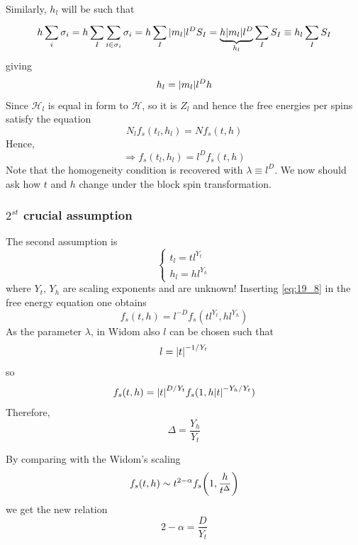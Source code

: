 \documentclass[../main/main.tex]{subfiles}
\begin{document}
Similarly, \( h_l \) will be such that
\begin{equation}
  h \sum_{i}^{} \sigma _i = h \sum_{I}^{} \sum_{i \in \sigma _i}^{}  \sigma _i = h \sum_{I}^{}    \abs{m_l} l^D S_I
  = \underbrace{h \abs{m_l} l^D}_{h_l} \sum_{I}^{} S_I \equiv  h_l \sum_{I}^{} S_I
\end{equation}
giving
\begin{equation}
  h_l = \abs{m_l} l^D h
\end{equation}
Since \( \mathcal{H}_l \) is equal in form to \( \mathcal{H} \), so it is \( Z_l \) and hence the free energies per spins satisfy the equation
\begin{equation}
  N_l f_s (t_l,h_l) = N f_s (t,h)
\end{equation}
Hence,
\begin{equation}
  \Rightarrow  f_s (t_l,h_l) = l^D f_s (t,h)
\end{equation}
Note that the homogeneity condition is recovered with \( \lambda \equiv l^D \).
We now should ask how \( t \) and \( h \) change under the block spin transformation.

\subsubsection{\(  2^{st} \) crucial assumption}
The second assumption is
\begin{equation}
  \begin{cases}
     t_l = t l^{Y_t}\\
  h_l = h l^{Y_h}
  \end{cases}
  \label{eq:19_8}
\end{equation}
where \( Y_t, \, Y_h \) are scaling exponents and are unknown!
Inserting \eqref{eq:19_8} in the free energy equation one obtains
\begin{equation}
  f_s (t,h) = l^{-D} f_s (t l^{Y_t}, h l^{Y_h})
\end{equation}
As the parameter \( \lambda  \), in Widom also \( l \)  can be chosen such that
\begin{equation}
  l= \abs{t}^{-1/Y_t}
\end{equation}
so
\begin{equation}
  f_s (t,h) = \abs{t}^{D/Y_t} f_s (1, h \abs{t}^{-Y_h/Y_t} )
\end{equation}
Therefore,
\begin{equation}
  \Delta = \frac{Y_h}{Y_t}
\end{equation}
\begin{remark}
By comparing with the Widom's scaling
\begin{equation}
  f_s (t,h) \sim t^{2- \alpha } f_s \qty(1, \frac{h}{t^\Delta})
\end{equation}
we get the new relation
\begin{equation}
  2 - \alpha = \frac{D}{Y_t}
\end{equation}
\end{remark}
\end{document}
